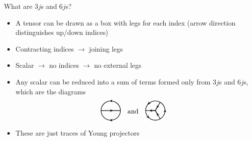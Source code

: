 \documentclass{beamer}
\begin{document}
    \begin{frame}{What are \(3j\)s and \(6j\)s?}
        \begin{itemize}
            \item A tensor can be drawn as a box with legs for each index (arrow direction distinguishes up/down indices)
            \item Contracting indices \(\to\) joining legs
            \item Scalar \(\to\) no indices \(\to\) no external legs
            \item Any scalar can be reduced into a sum of terms formed only from \(3j\)s and \(6j\)s, which are the diagrams
            \begin{equation*}
                \begin{tikzpicture}[scale=0.5, baseline=-0.15cm, thick, >=stealth]
                    \draw (0, 0) circle [radius = 1cm];
                    \draw (-1, 0) -- (1, 0);
                    \draw[->] (-0.1, 1) -- ++ (-0.01, 0);
                    \draw[->] (-0.1, -1) -- ++ (-0.01, 0);
                    \draw[->] (0.2, 0) -- ++ (0.01, 0);
                \end{tikzpicture}
                \quad \text{and} \quad
                \begin{tikzpicture}[scale=0.5, baseline=-0.15cm, thick, >=stealth]
                    \draw (0, 0) circle [radius = 1cm];
                    \draw (0, 0) -- (60:1);
                    \draw (0, 0) -- (-60:1);
                    \draw (0, 0) -- (180:1);
                    \draw[-<] (0, 0) -- (60:0.6);
                    \draw[-<] (0, 0) -- (-60:0.6);
                    \draw[->] (0, 0) -- (180:0.6);
                    \draw[->] (1, 0.1) -- ++ (0, 0.01);
                    \draw[->] (140:1) -- ++ (225:0.01);
                    \draw[->] (230:1) -- ++ (-45:0.01);
                \end{tikzpicture}
            \end{equation*}
            \item These are just traces of Young projectors
        \end{itemize}
    \end{frame}
    
\end{document}
